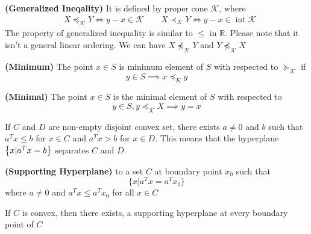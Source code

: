 \begin{definition}{\textbf{(Generalized Ineqality)}}
    It is defined by proper cone $\mathcal{K}$, where 
    \begin{equation*}
    \begin{aligned}
        &X \preceq_\mathcal{K} Y \iff y-x\in\mathcal{K} \qquad X \prec_\mathcal{K} Y \iff y-x\in\operatorname{int}\mathcal{K}
    \end{aligned}
    \end{equation*}
    The property of generalized inequality is similar to $\le$ in $\mathbb{R}$. Please note that it isn't a general linear ordering. We can have $X\not\preceq_\mathcal{K} Y$ and $Y \not\preceq_\mathcal{K}X$
\end{definition}

\begin{definition}{\textbf{(Minimum)}}
    The point $x\in S$ is minimum element of $S$ with respected to $\succeq_\mathcal{K}$ if 
    \begin{equation*}
        y\in S \implies x\preceq_K y
    \end{equation*}
\end{definition}

\begin{definition}{\textbf{(Minimal)}}
    The point $x\in S$ is the minimal element of $S$ with respected to 
    \begin{equation*}
        y \in S, y \preceq_\mathcal{K} X \implies y=x
    \end{equation*}
\end{definition}

\begin{theorem}
    If $C$ and $D$ are non-empty disjoint convex set, there exists $a\ne0$ and $b$ such that $a^Tx \le b$ for $x\in C$ and $a^Tx>b$ for $x\in D$. This means that the hyperplane $\left\{ x | a^Tx = b \right\}$ separates $C$ and $D$.
\end{theorem}

\begin{definition}{\textbf{(Supporting Hyperplane)}}
    to a set $C$ at boundary point $x_0$ such that 
    \begin{equation*}
        \Big\{ x \Big| a^Tx = a^Tx_0 \Big\}
    \end{equation*}
    where $a\ne0$ and $a^Tx \le a^Tx_0$ for all $x\in C$
\end{definition}

\begin{theorem}
    If $C$ is convex, then there exists, a supporting hyperplane at every boundary point of $C$
\end{theorem}

